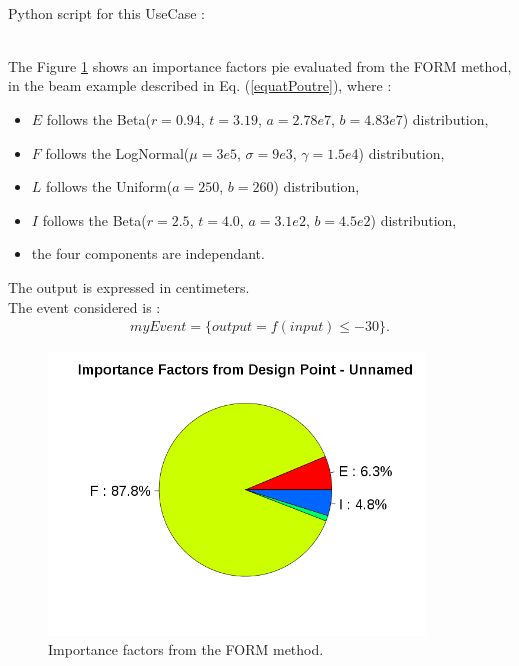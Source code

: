              \textspace\\
             Python  script for this UseCase :




             \textspace\\


             The Figure \ref{FORMImportanceFactors}  shows an importance factors pie evaluated from the FORM method, in the beam example described in Eq. (\ref{equatPoutre}), where :
             \begin{itemize}
             \item $E$ follows the Beta($r = 0.94$, $t = 3.19$, $a = 2.78e7$, $b = 4.83e7$) distribution,
             \item $F$ follows the LogNormal($\mu = 3e5$, $\sigma = 9e3$, $\gamma = 1.5e4$)  distribution,
             \item $L$ follows the Uniform($a = 250$, $b=260$) distribution,
             \item $I$ follows the Beta($r = 2.5$, $t = 4.0$, $a = 3.1e2$, $b = 4.5e2$) distribution,
             \item the four components are independant.
             \end{itemize}

             The output is expressed in centimeters.\\
             The event considered is :
             \begin{align*}
               myEvent = \{ output=f(input) \leq -30 \}.
             \end{align*}



             \begin{figure}[H]
               \begin{center}
                 \includegraphics[width=10cm]{Figures/ImportanceFactorsDrawingFORM.png}
               \end{center}
               \caption{Importance factors from the FORM method.}
               \label{FORMImportanceFactors}
             \end{figure}

